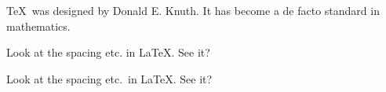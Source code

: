\documentclass{article}
\begin{document}
\TeX\ was designed by Donald E. Knuth.
It has become a de facto standard in mathematics.

Look at the spacing etc. in LaTeX. See it?

Look at the spacing etc.\ in LaTeX\@. See it?
\end{document}
